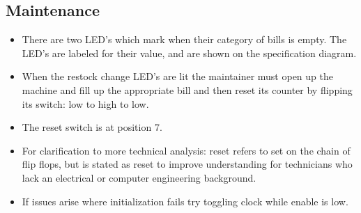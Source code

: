 \subsection{Maintenance}
\begin{itemize}
\item{There are two LED's which mark when their category of  bills is empty. The LED's are labeled for their value, and are shown on the specification diagram.}

\item{When the restock change LED's are lit the maintainer must open up the machine and fill up the appropriate bill and then reset its counter by 
flipping its switch: low to high to low.}
\item{The reset switch is at position 7.} 

\item{For clarification to more technical analysis: reset refers to set on
the chain of flip flops, but is stated as reset to improve understanding for 
technicians who lack an electrical or computer engineering background.}

\item{If issues arise where initialization fails try toggling clock while
enable is low.}
\end{itemize}
